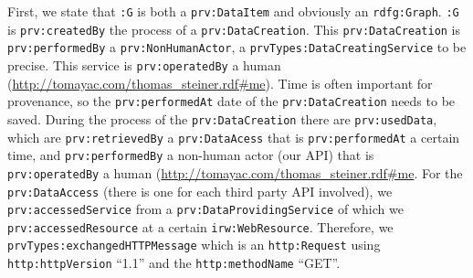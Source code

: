 \documentclass[conference]{IEEEtran}
\begin{document}
First, we state that \texttt{:G} is both a \texttt{prv:DataItem} and obviously an \texttt{rdfg:Graph}. \texttt{:G} is \texttt{prv:createdBy} the process of a \texttt{prv:DataCreation}. This \texttt{prv:DataCreation} is \texttt{prv:performedBy} a \texttt{prv:NonHumanActor}, a \texttt{prvTypes:DataCreatingService} to be precise. This service is \texttt{prv:operatedBy} a human (\url{http://tomayac.com/thomas_steiner.rdf#me}). Time is often important for provenance, so the \texttt{prv:performedAt} date of the \texttt{prv:DataCreation} needs to be saved. During the process of the \texttt{prv:DataCreation} there are \texttt{prv:usedData}, which are \texttt{prv:retrievedBy} a \texttt{prv:DataAcess} that is \texttt{prv:performedAt} a certain time, and \texttt{prv:performedBy} a non-human actor (our API) that is \texttt{prv:operatedBy} a human (\url{http://tomayac.com/thomas_steiner.rdf#me}. For the \texttt{prv:DataAccess} (there is one for each third party API involved), we \texttt{prv:accessedService} from a \texttt{prv:DataProvidingService} of which we \texttt{prv:accessedResource} at a certain \texttt{irw:WebResource}. Therefore, we \texttt{prvTypes:exchangedHTTPMessage} which is an \texttt{http:Request} using \texttt{http:httpVersion} ``1.1'' and the \texttt{http:methodName} ``GET''.
\end{document}

